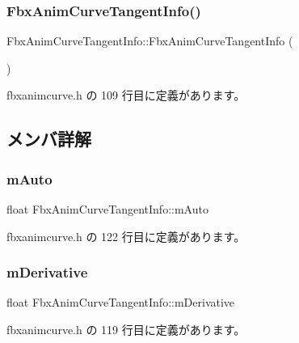 \subsubsection{\texorpdfstring{Fbx\+Anim\+Curve\+Tangent\+Info()}{FbxAnimCurveTangentInfo()}}
{\footnotesize\ttfamily Fbx\+Anim\+Curve\+Tangent\+Info\+::\+Fbx\+Anim\+Curve\+Tangent\+Info (\begin{DoxyParamCaption}{ }\end{DoxyParamCaption})\hspace{0.3cm}{\ttfamily [inline]}}



 fbxanimcurve.\+h の 109 行目に定義があります。



\subsection{メンバ詳解}
\mbox{\label{struct_fbx_anim_curve_tangent_info_a24d7f2c4210a679ddc3e5e846282c47c}} 
\subsubsection{\texorpdfstring{m\+Auto}{mAuto}}
{\footnotesize\ttfamily float Fbx\+Anim\+Curve\+Tangent\+Info\+::m\+Auto}



 fbxanimcurve.\+h の 122 行目に定義があります。

\mbox{\label{struct_fbx_anim_curve_tangent_info_abd0ff621b7ca5bb0edf54f62dadfed25}} 
\subsubsection{\texorpdfstring{m\+Derivative}{mDerivative}}
{\footnotesize\ttfamily float Fbx\+Anim\+Curve\+Tangent\+Info\+::m\+Derivative}



 fbxanimcurve.\+h の 119 行目に定義があります。

